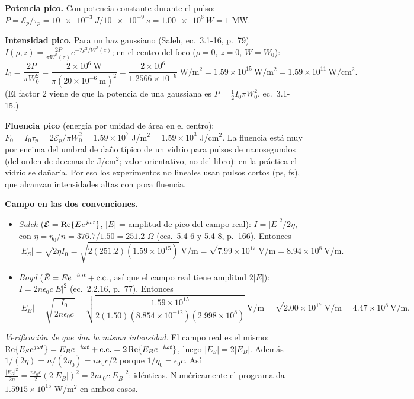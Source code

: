  \textbf{Potencia pico.} Con potencia constante durante el pulso:
$P=\mathcal E_p/\tau_p=\SI{10e-3}{J}/\SI{10e-9}{s}=\SI{1.00e6}{W}=1$ MW.

\textbf{Intensidad pico.} Para un haz gaussiano (Saleh, ec.~3.1-16, p.~79)
$I(\rho,z)=\frac{2P}{\pi W^2(z)}e^{-2\rho^2/W^2(z)}$; en el centro del foco ($\rho=0$, $z=0$, $W=W_0$):
\begin{equation*}
I_0=\frac{2P}{\pi W_0^2}=\frac{2\times10^6\ \mathrm{W}}{\pi(20\times10^{-6}\ \mathrm m)^2}
=\frac{2\times10^6}{1.2566\times10^{-9}}\ \mathrm{W/m^2}=1.59\times10^{15}\ \mathrm{W/m^2}=1.59\times10^{11}\ \mathrm{W/cm^2}.
\end{equation*}
(El factor 2 viene de que la potencia de una gaussiana es $P=\frac12I_0\pi W_0^2$, ec.~3.1-15.)

\textbf{Fluencia pico} (energía por unidad de área en el centro): $F_0=I_0\tau_p=2\mathcal E_p/\pi W_0^2
=1.59\times10^{7}$ J/m$^2=1.59\times10^3$ J/cm$^2$.
La fluencia está muy por encima del umbral de daño típico de un vidrio para pulsos de nanosegundos
(del orden de decenas de J/cm$^2$; valor orientativo, no del libro): en la práctica el vidrio se
dañaría. Por eso los experimentos no lineales usan pulsos cortos (ps, fs), que alcanzan
intensidades altas con poca fluencia.

 \textbf{Campo en las dos convenciones.}
\begin{itemize}
\item \emph{Saleh} ($\boldsymbol{\mathcal E}=\mathrm{Re}\{Ee^{j\omega t}\}$, $|E|$ = amplitud de pico del campo real):
$I=|E|^2/2\eta$, con $\eta=\eta_0/n=376.7/1.50=251.2$ $\Omega$ (ecs.~5.4-6 y 5.4-8, p.~166). Entonces
\begin{equation*}
|E_S|=\sqrt{2\eta I_0}=\sqrt{2(251.2)(1.59\times10^{15})}\ \mathrm{V/m}=\sqrt{7.99\times10^{17}}\ \mathrm{V/m}=8.94\times10^8\ \mathrm{V/m}.
\end{equation*}
\item \emph{Boyd} ($\tilde E=Ee^{-i\omega t}+\text{c.c.}$, así que el campo real tiene amplitud $2|E|$):
$I=2n\epsilon_0c|E|^2$ (ec.~2.2.16, p.~77). Entonces
\begin{equation*}
|E_B|=\sqrt{\frac{I_0}{2n\epsilon_0c}}=\sqrt{\frac{1.59\times10^{15}}{2(1.50)(8.854\times10^{-12})(2.998\times10^8)}}\ \mathrm{V/m}
=\sqrt{2.00\times10^{17}}\ \mathrm{V/m}=4.47\times10^8\ \mathrm{V/m}.
\end{equation*}
\end{itemize}
\emph{Verificación de que dan la misma intensidad.} El campo real es el mismo:
$\mathrm{Re}\{E_Se^{j\omega t}\}=E_Be^{-i\omega t}+\text{c.c.}=2\,\mathrm{Re}\{E_Be^{-i\omega t}\}$, luego $|E_S|=2|E_B|$.
Además $1/(2\eta)=n/(2\eta_0)=n\epsilon_0c/2$ porque $1/\eta_0=\epsilon_0c$. Así
$\frac{|E_S|^2}{2\eta}=\frac{n\epsilon_0c}{2}(2|E_B|)^2=2n\epsilon_0c|E_B|^2$: idénticas.
Numéricamente el programa da $1.5915\times10^{15}$ W/m$^2$ en ambos casos.

